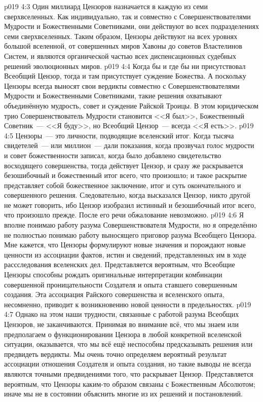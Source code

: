 \vs p019 4:3 Один миллиард Цензоров назначается в каждую из семи сверхвселенных. Как индивидуально, так и совместно с Совершенствователями Мудрости и Божественными Советниками, они действуют во всех подразделениях семи сверхвселенных. Таким образом, Цензоры действуют на всех уровнях большой вселенной, от совершенных миров Хавоны до советов Властелинов Систем, и являются органической частью всех диспенсационных судебных решений эволюционных миров.
\vs p019 4:4 \pc Когда бы и где бы ни присутствовал Всеобщий Цензор, тогда и там присутствует суждение Божества. А поскольку Цензоры всегда выносят свои вердикты совместно с Совершенствователями Мудрости и Божественными Советниками, такие решения охватывают объединённую мудрость, совет и суждение Райской Троицы. В этом юридическом трио Совершенствователь Мудрости становится <<Я был>>, Божественный Советник~--- <<Я буду>>, но Всеобщий Цензор~--- всегда <<Я есть>>.
\vs p019 4:5 \pc Цензоры~--- это личности, подводящие вселенский итог. Когда тысяча свидетелей~--- или миллион~--- дали показания, когда прозвучал голос мудрости и совет божественности записал, когда было добавлено свидетельство восходящего совершенства, тогда действует Цензор, и сразу же раскрывается безошибочный и божественный итог всего, что произошло; и такое раскрытие представляет собой божественное заключение, итог и суть окончательного и совершенного решения. Следовательно, когда высказался Цензор, никто другой не может говорить, ибо Цензор изобразил истинный и безошибочный итог всего, что произошло прежде. После его речи обжалование невозможно.
\vs p019 4:6 Я вполне понимаю работу разума Совершенствователя Мудрости, но я определённо не полностью понимаю работу выносящего приговор разума Всеобщего Цензора. Мне кажется, что Цензоры формулируют новые значения и порождают новые ценности из ассоциации фактов, истин и сведений, представленных им в ходе рассследования вселенских дел. Представляется вероятным, что Всеобщие Цензоры способны рождать оригинальные интерпретации комбинации совершенной проницательности Создателя и опыта ставшего совершенным создания. Эта ассоциация Райского совершенства и вселенского опыта, несомненно, приводит к возникновению новой ценности в предельностях.
\vs p019 4:7 Однако на этом наши трудности, связанные с работой разума Всеобщих Цензоров, не заканчиваются. Принимая во внимание всё,  что мы знаем или предполагаем о функционировании Цензора в любой конкретной вселенской ситуации, оказывается, что мы всё ещё неспособны предсказывать решения или предвидеть вердикты. Мы очень точно определяем вероятный результат ассоциации отношения Создателя и опыта создания, но такие выводы не всегда являются точными предвидениями того, что раскрывает Цензор. Представляется вероятным, что Цензоры каким\hyp{}то образом связаны с Божественным Абсолютом; иначе мы не в состоянии объяснить многие из их решений и постановлений.
